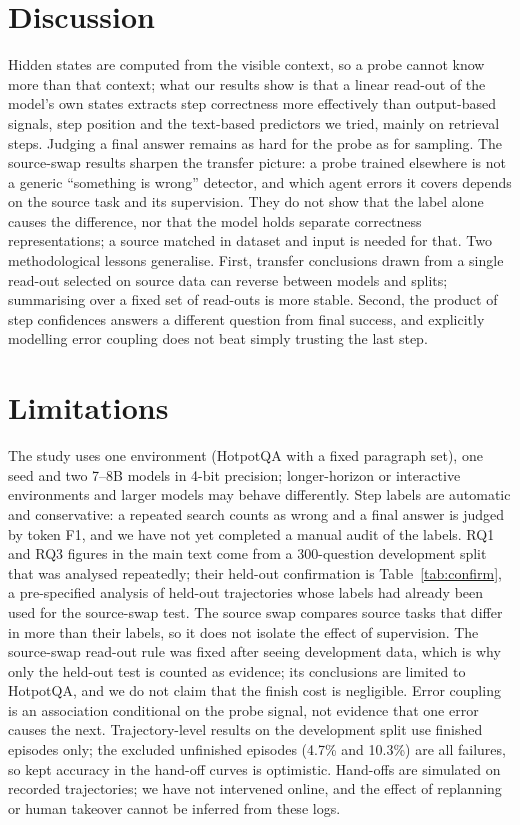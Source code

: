 \documentclass[11pt]{article}
\begin{document}
\section{Discussion}
Hidden states are computed from the visible context, so a probe cannot know more than that context; what our
results show is that a linear read-out of the model's own states extracts step correctness more effectively than
output-based signals, step position and the text-based predictors we tried, mainly on retrieval steps. Judging a
final answer remains as hard for the probe as for sampling. The source-swap results sharpen the transfer picture: a
probe trained elsewhere is not a generic ``something is wrong'' detector, and which agent errors it covers depends
on the source task and its supervision. They do not show that the label alone causes the difference, nor that the
model holds separate correctness representations; a source matched in dataset and input is needed for that. Two
methodological lessons generalise. First, transfer conclusions drawn from a single read-out selected on source data
can reverse between models and splits; summarising over a fixed set of read-outs is more stable. Second, the product
of step confidences answers a different question from final success, and explicitly modelling error coupling does
not beat simply trusting the last step.

\section*{Limitations}
The study uses one environment (HotpotQA with a fixed paragraph set), one seed and two 7--8B models in 4-bit
precision; longer-horizon or interactive environments and larger models may behave differently. Step labels are
automatic and conservative: a repeated search counts as wrong and a final answer is judged by token F1, and we have
not yet completed a manual audit of the labels. RQ1 and RQ3 figures in the main text come from a 300-question
development split that was analysed repeatedly; their held-out confirmation is Table~\ref{tab:confirm}, a
pre-specified analysis of held-out trajectories whose labels had already been used for the source-swap test. The
source swap compares source tasks that differ in more than their labels, so it does not isolate the effect of
supervision. The source-swap read-out rule was fixed after seeing development data, which is why only the held-out test is counted
as evidence; its conclusions are limited to HotpotQA, and we do not claim that the finish cost is negligible.
Error coupling is an association conditional on the probe signal, not evidence that one error causes the next.
Trajectory-level results on the development split use finished episodes only; the excluded unfinished episodes
(4.7\% and 10.3\%) are all failures, so kept accuracy in the hand-off curves is optimistic. Hand-offs are simulated
on recorded trajectories; we have not intervened online, and the effect of replanning or human takeover cannot be
inferred from these logs.
\end{document}
